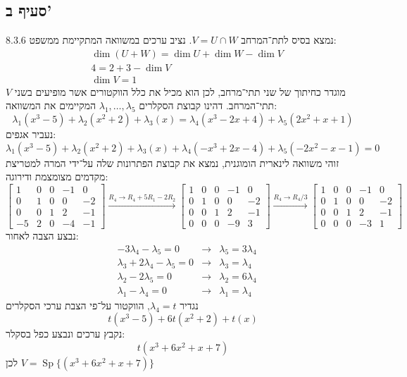 \documentclass[a4paper]{article}
\DeclareMathOperator\Sp{Sp}
\begin{document}
\subsection{סעיף ב'}
נמצא בסיס לתת־המרחב $V = U \cap W$.
נציב ערכים במשוואה המתקיימת ממשפט 8.3.6:
\[
	\begin{aligned}
		& \dim(U + W) = \dim U + \dim W - \dim V \\
		& 4 = 2 + 3 - \dim V \\
		& \dim V = 1
	\end{aligned}
\]
$V$ מוגדר כחיתוך של שני תתי־מרחב, לכן הוא מכיל את כלל הווקטורים אשר
מופיעים בשני תתי־המרחב.
דהינו קבוצת הסקלרים $\lambda_1, \hdots, \lambda_5$
המקיימים את המשוואה:
\[
	\lambda_1 (x^3 - 5) + \lambda_2 (x^2 + 2) + \lambda_3 (x)
	= \lambda_4 (x^3 - 2x + 4) + \lambda_5 (2x^2 + x + 1)
\]
נעביר אגפים:
\[
	\lambda_1 (x^3 - 5) + \lambda_2 (x^2 + 2) + \lambda_3 (x) +
	\lambda_4 (-x^3 + 2x - 4) + \lambda_5 (-2x^2 - x - 1)
	= 0
\]
זוהי משוואה לינארית הומוגנית,
נמצא את קבוצת הפתרונות שלה על־ידי המרה למטריצת מקדמים מצומצמת ודירוגה:
\[
	\begin{bmatrix}
		1 & 0 & 0 & -1 & 0 \\
		0 & 1 & 0 & 0 & -2 \\
		0 & 0 & 1 & 2 & -1 \\
		-5 & 2 & 0 & -4 & -1
	\end{bmatrix}
	\xrightarrow{R_4 \rightarrow R_4 + 5R_1 - 2R_2}
	\begin{bmatrix}
		1 & 0 & 0 & -1 & 0 \\
		0 & 1 & 0 & 0 & -2 \\
		0 & 0 & 1 & 2 & -1 \\
		0 & 0 & 0 & -9 & 3
	\end{bmatrix}
	\xrightarrow{R_4 \rightarrow R_4 / 3}
	\begin{bmatrix}
		1 & 0 & 0 & -1 & 0 \\
		0 & 1 & 0 & 0 & -2 \\
		0 & 0 & 1 & 2 & -1 \\
		0 & 0 & 0 & -3 & 1
	\end{bmatrix}
\]
נבצע הצבה לאחור:
\[
	\begin{aligned}
		& -3\lambda_4 - \lambda_5 = 0 & \rightarrow 
		& \lambda_5 = 3\lambda_4 \\
		& \lambda_3 + 2 \lambda_4 - \lambda_5 = 0 & \rightarrow
		& \lambda_3 = \lambda_4 \\
		& \lambda_2 - 2 \lambda_5 = 0 & \rightarrow
		& \lambda_2 = 6 \lambda_4 \\
		& \lambda_1 - \lambda_4 = 0 & \rightarrow
		& \lambda_1 = \lambda_4
	\end{aligned}
\]
נגדיר $\lambda_4 = t$, הווקטור על־פי הצבת ערכי הסקלרים
\[
	t (x^3 - 5) + 6t (x^2 + 2) + t (x)
\]
נקבץ ערכים ונבצע כפל בסקלר:
\[
	t (x^3 + 6x^2 + x + 7)
\]
לכן $V = \Sp\{ (x^3 + 6x^2 + x + 7) \}$
\end{document}
